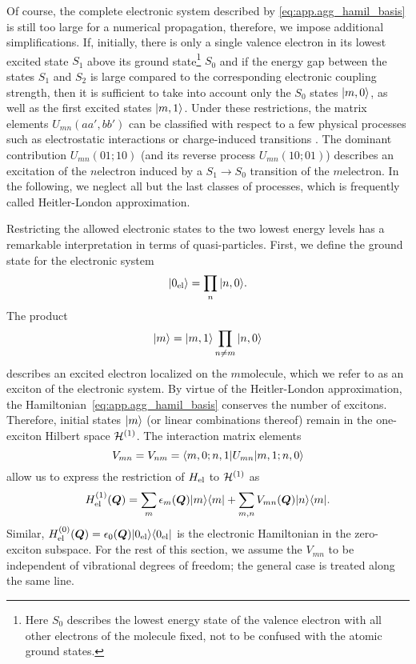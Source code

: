 Of course, the complete electronic system described by \autoref{eq:app.agg_hamil_basis} is still too large for a numerical propagation, therefore, we impose additional simplifications.
If, initially, there is only a single valence electron in its lowest excited state $S_1$ above its ground state\footnote{%
  Here $S_0$ describes the lowest energy state of the valence electron with all other electrons of the molecule fixed, not to be confused with the atomic ground states.
}
$S_0$ and if the energy gap between the states $S_1$ and $S_2$ is large compared to the corresponding electronic coupling strength, then it is sufficient to take into account only the $S_0$ states $| m, 0 \rangle$, as well as the first excited states $| m, 1 \rangle$.
Under these restrictions, the matrix elements $U_{mn}(aa', bb')$ can be classified with respect to a few physical processes such as electrostatic interactions or charge-induced transitions \cite{MaKu11_dynamics}.
The dominant contribution $U_{mn}(01; 10)$ (and its reverse process $U_{mn}(10; 01)$) describes an excitation of the $n$\th electron induced by a $S_1 \to S_0$ transition of the $m$\th electron.
In the following, we neglect all but the last classes of processes, which is frequently called Heitler-London approximation.

Restricting the allowed electronic states to the two lowest energy levels has a remarkable interpretation in terms of quasi-particles.
First, we define the ground state for the electronic system
\begin{equation}
  | 0_\mathrm{el} \rangle = \prod_{n} | n, 0 \rangle.
  \label{eq:app.ground_state}
\end{equation}
The product
\begin{equation}
  | m \rangle = | m, 1 \rangle \prod_{n \neq m} | n, 0 \rangle
  \label{eq:app.exciton_state}
\end{equation}
describes an excited electron localized on the $m$\th molecule, which we refer to as an exciton of the electronic system.
By virtue of the Heitler-London approximation, the Hamiltonian~\ref{eq:app.agg_hamil_basis} conserves the number of excitons.
Therefore, initial states $| m \rangle$ (or linear combinations thereof) remain in the one-exciton Hilbert space $\mathcal{H}^{(1)}$.
The interaction matrix elements
\begin{equation*}
  V_{mn} = V_{nm} = \langle m, 0; n, 1 | U_{mn} | m, 1; n, 0 \rangle
\end{equation*}
allow us to express the restriction of $H_\mathrm{el}$ to $\mathcal{H}^{(1)}$ as
\begin{equation*}
  H_\mathrm{el}^{(1)}(\boldsymbol{Q}) = \sum_m \epsilon_m(\boldsymbol{Q}) | m \rangle\langle m | + \sum_{m,n} V_{mn}(\boldsymbol{Q}) | n \rangle\langle m |.
\end{equation*}
Similar, $H_\mathrm{el}^{(0)}(\boldsymbol{Q}) = \epsilon_0(\boldsymbol{Q}) | 0_\mathrm{el} \rangle\langle 0_\mathrm{el} |$ is the electronic Hamiltonian in the zero-exciton subspace.
For the rest of this section, we assume the $V_{mn}$ to be independent of vibrational degrees of freedom; the general case is treated along the same line.\\



